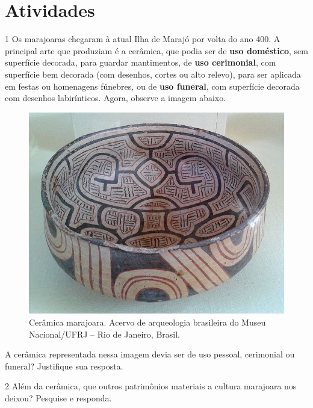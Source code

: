 \pagebreak
\section*{Atividades}

\num{1} Os marajoaras chegaram à atual Ilha de Marajó por volta do ano 400. A principal arte que produziam é a cerâmica, que podia ser de \textbf{uso doméstico}, sem superfície decorada, para guardar mantimentos, de \textbf{uso cerimonial}, com superfície bem decorada (com desenhos, cortes ou alto relevo), para ser aplicada em festas ou homenagens fúnebres, ou de \textbf{uso funeral}, com superfície decorada com desenhos labirínticos. Agora, observe a imagem abaixo.

\begin{figure}[htpb!]
\includegraphics[width=\textwidth]{./imgs/art24.jpg}
\caption{Cerâmica marajoara. Acervo de arqueologia brasileira do Museu Nacional/UFRJ – Rio de Janeiro, Brasil.}
\end{figure}

\noindent{}A cerâmica representada nessa imagem devia ser de uso pessoal, cerimonial ou funeral? Justifique sua resposta.



\num{2}  Além da cerâmica, que outros patrimônios materiais a cultura marajoara nos deixou? Pesquise e responda.



